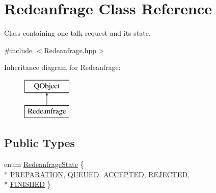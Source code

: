 \hypertarget{class_redeanfrage}{}\section{Redeanfrage Class Reference}
\label{class_redeanfrage}


Class containing one talk request and its state.  




{\ttfamily \#include $<$Redeanfrage.\+hpp$>$}

Inheritance diagram for Redeanfrage\+:\begin{figure}[H]
\begin{center}
\leavevmode
\includegraphics[height=2.000000cm]{class_redeanfrage}
\end{center}
\end{figure}
\subsection*{Public Types}
\begin{DoxyCompactItemize}
\item 
enum \hyperlink{class_redeanfrage_ac4156718456ad89ed6d32e281a8bac18}{Redeanfrage\+State} \{ \\*
\hyperlink{class_redeanfrage_ac4156718456ad89ed6d32e281a8bac18a6cba11c1a96fe60aee29cd341d998254}{P\+R\+E\+P\+A\+R\+A\+T\+I\+O\+N}, 
\hyperlink{class_redeanfrage_ac4156718456ad89ed6d32e281a8bac18a557e21c2f59009e72cd8160dfb493f08}{Q\+U\+E\+U\+E\+D}, 
\hyperlink{class_redeanfrage_ac4156718456ad89ed6d32e281a8bac18a217bb92c818ea26f6b8554a4cf374a61}{A\+C\+C\+E\+P\+T\+E\+D}, 
\hyperlink{class_redeanfrage_ac4156718456ad89ed6d32e281a8bac18a9130e0ad36fc7f13a9896dc5d561fbdf}{R\+E\+J\+E\+C\+T\+E\+D}, 
\\*
\hyperlink{class_redeanfrage_ac4156718456ad89ed6d32e281a8bac18a66196f5384c2da89e04966043bd7ec55}{F\+I\+N\+I\+S\+H\+E\+D}
 \}
\end{DoxyCompactItemize}
